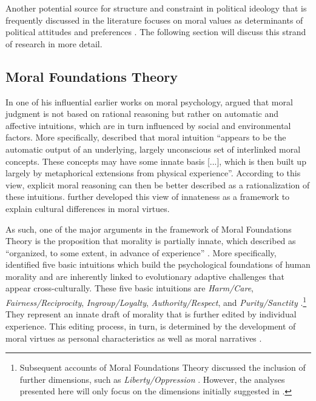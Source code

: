 \documentclass[12pt]{article}
\begin{document}
Another potential source for structure and constraint in political ideology that is frequently discussed in the literature focuses on moral values as determinants of political attitudes and preferences \citep{lakoff1995metaphor,haidt2008moral,mcadams2008family}. The following section will discuss this strand of research in more detail.


\subsection{Moral Foundations Theory}

In one of his influential earlier works on moral psychology, \citet{haidt2001emotional} argued that moral judgment is not based on rational reasoning but rather on automatic and affective intuitions, which are in turn influenced by social and environmental factors. More specifically, \citet[825]{haidt2001emotional} described that moral intuition ``appears to be the automatic output of an underlying, largely unconscious set of interlinked moral concepts. These concepts may have some innate basis [...], which is then built up largely by metaphorical extensions from physical experience''. According to this view, explicit moral reasoning can then be better described as a rationalization of these intuitions. \citet{haidt2004intuitive} further developed this view of innateness as a framework to explain cultural differences in moral virtues.

As such, one of the major arguments in the framework of Moral Foundations Theory is the proposition that morality is partially innate, which \citet[367]{haidt2008moral} described as ``organized, to some extent, in advance of experience'' \citep[but see][]{suhler2011can}. More specifically, \citet{haidt2008moral} identified five basic intuitions which build the psychological foundations of human morality and are inherently linked to evolutionary adaptive challenges that appear cross-culturally. These five basic intuitions are \textit{Harm/Care}, \textit{Fairness/Reciprocity}, \textit{Ingroup/Loyalty}, \textit{Authority/Respect}, and \textit{Purity/Sanctity} \citep[see also][]{graham2011mapping}.\footnote{Subsequent accounts of Moral Foundations Theory discussed the inclusion of further dimensions, such as \textit{Liberty/Oppression} \citep[c.f.][]{graham2013moral,haidt2012righteous}. However, the analyses presented here will only focus on the dimensions initially suggested in \citet{haidt2008moral}.} They represent an innate draft of morality that is further edited by individual experience. This editing process, in turn, is determined by the development of moral virtues as personal characteristics as well as moral narratives \citep{haidt2008moral}.
\end{document}
